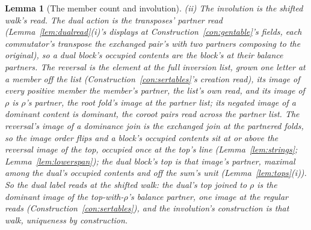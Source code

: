 \documentclass[11pt]{article}
\newtheorem{lemma}{Lemma}
\theoremstyle{definition}
\begin{document}
\begin{lemma}[The member count and involution]
\emph{(ii) The involution is the shifted walk's read.} The dual
action is the transposes' partner read
(Lemma~\ref{lem:dualread}(i)'s displays at
Construction~\ref{con:gentable}'s fields, each commutator's
transpose the exchanged pair's with two partners composing to the
original), so a dual block's occupied contents are the block's at
their balance partners. The \emph{reversal} is the element at the
full inversion list, grown one letter at a member off the list
(Construction~\ref{con:sertables}'s creation read), its image of
every positive member the member's partner, the list's own read,
and its image of $\rho$ is $\rho$'s partner, the root fold's
image at the partner list; its negated image of a dominant
content is dominant, the coroot pairs read across the partner
list. The reversal's image of a dominance join is the exchanged
join at the partnered folds, so the image order flips and a
block's occupied contents sit at or above the reversal image of
the top, occupied once at the top's line
(Lemma~\ref{lem:strings}; Lemma~\ref{lem:lowerspan}); the dual
block's top is that image's partner, maximal among the dual's
occupied contents and off the sum's unit
(Lemma~\ref{lem:tops}(i)). So the \emph{dual label} reads at the
shifted walk: the dual's top joined to $\rho$ is the dominant
image of the top-with-$\rho$'s balance partner, one image at the
regular reads (Construction~\ref{con:sertables}), and the
involution's construction is that walk, uniqueness by
construction.
\end{lemma}
\end{document}
